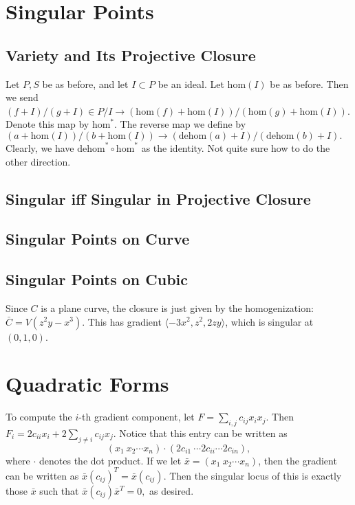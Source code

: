 \documentclass[11pt]{amsart}
\theoremstyle{named}
\renewcommand{\hom}[1]{\mathrm{hom}(#1)}
\newcommand{\home}{\mathrm{hom}}
\newcommand{\dhom}[1]{\mathrm{dehom}(#1)}
\newcommand{\dehom}{\mathrm{dehom}}
\begin{document}
\section{Singular Points}
\subsection{Variety and Its Projective Closure}
Let $P, S$ be as before, and let $I \subset P$ be an ideal. Let $\hom I$ be as before. Then we send $(f + I)/(g + I) \in P/I \rightarrow (\hom f + \hom I)/(\hom g + \hom I)$. Denote this map by $\home^*$. The reverse map we define by $(a + \hom I)/(b + \hom I) \rightarrow (\dhom a + I)/(\dhom b + I).$ Clearly, we have $\dehom^* \circ \home^*$ as the identity. Not quite sure how to do the other direction.

\subsection{Singular iff Singular in Projective Closure}

\subsection{Singular Points on Curve}

\subsection{Singular Points on Cubic}
Since $C$ is a plane curve, the closure is just given by the homogenization: $\bar{C} = V(z^2 y - x^3).$ This has gradient $\langle -3x^2, z^2, 2zy \rangle$, which is singular at $(0, 1, 0)$.

\section{Quadratic Forms}
To compute the $i$-th gradient component, let $F = \sum_{i, j} c_{ij} x_i x_j$. Then $F_i = 2 c_{ii} x_i + 2 \sum_{j \neq i} c_{ij} x_j$. Notice that this entry can be written as \[(x_1 \ x_2 \cdots x_n) \cdot (2c_{i1} \ \cdots 2c_{ii} \cdots 2c_{in}),\] where $\cdot$ denotes the dot product. If we let $\bar{x} = (x_1 \ x_2 \cdots x_n)$, then the gradient can be written as $\bar{x} (c_{ij})^T = \bar{x} (c_{ij}).$ Then the singular locus of this is exactly those $\bar{x}$ such that $\bar{x} (c_{ij}) \bar{x}^T = 0,$ as desired.
\end{document}
